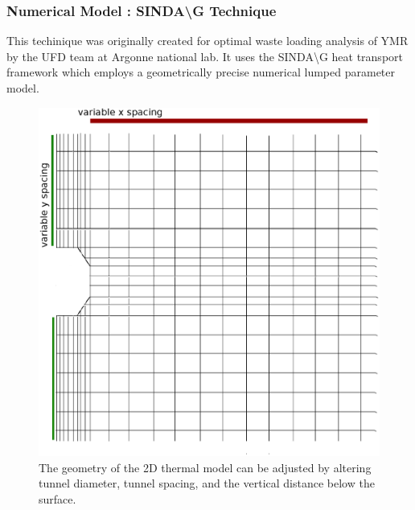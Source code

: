 

\begin{frame}[ctb!]
  \frametitle{Numerical Model : SINDA{\textbackslash}G Technique}
  This techinique was originally created for optimal waste loading analysis of 
  YMR by the UFD team at Argonne national lab. It  uses the 
  SINDA{\textbackslash}G heat transport framework which employs a geometrically 
  precise numerical lumped parameter model. 
  \begin{figure}[h!]
    \begin{center}
      \includegraphics[height=.5\textheight]{sindageom.eps}
    \end{center}
    \caption{The geometry of the 2D thermal model can be adjusted by altering 
    tunnel diameter, tunnel spacing, and the vertical distance below the 
    surface.}
    \label{fig:sindageom}
  \end{figure}
\end{frame}


